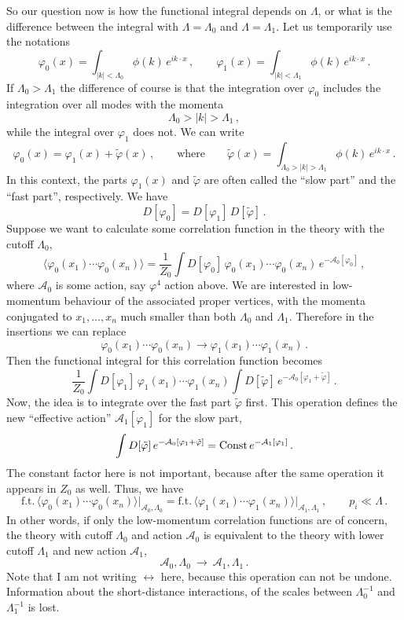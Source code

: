 So our question now is how the functional integral depends on $\Lambda$, or what
is the difference between the integral with $\Lambda=\Lambda_0$ and
$\Lambda=\Lambda_1$. Let us temporarily use the notations
\[
\varphi_0(x)=\int_{|k|<\Lambda_0}\phi(k)\,e^{ik\cdot x}\,,\qquad
\varphi_1(x)=\int_{|k|<\Lambda_1}\phi(k)\,e^{ik\cdot x}\,.
\]
If $\Lambda_0>\Lambda_1$ the difference of course is that the integration over
$\varphi_0$ includes the integration over all modes with the momenta
\[
\Lambda_0>|k|>\Lambda_1\,,
\]
while the integral over $\varphi_1$ does not. We can write
\[
\varphi_0(x)=\varphi_1(x)+\tilde\varphi(x)\,,\qquad\text{where}\qquad
\tilde\varphi(x)=\int_{\Lambda_0>|k|>\Lambda_1}\phi(k)\,e^{ik\cdot x}\,.
\]
In this context, the parts $\varphi_1(x)$ and $\tilde\varphi$ are often called
the ``slow part'' and the ``fast part'', respectively. We have
\[
D[\varphi_0]=D[\varphi_1]\,D[\tilde\varphi]\,.
\]
Suppose we want to calculate some correlation function in the theory with the
cutoff $\Lambda_0$,
\[
\bigl\langle\varphi_0(x_1)\cdots\varphi_0(x_n)\bigr\rangle=\frac1{Z_0}\int D[\varphi_0]\,\varphi_0(x_1)\cdots\varphi_0(x_n)\,e^{-\mathcal A_0[\varphi_0]}\,,
\]
where $\mathcal A_0$ is some action, say $\varphi^4$ action above. We are
interested in low-momentum behaviour of the associated proper vertices, with the
momenta conjugated to $x_1,\dots,x_n$ much smaller than both $\Lambda_0$ and
$\Lambda_1$. Therefore in the insertions we can replace
\[
\varphi_0(x_1)\cdots\varphi_0(x_n)\to\varphi_1(x_1)\cdots\varphi_1(x_n)\,.
\]
Then the functional integral for this correlation function becomes
\[
\frac1{Z_0}\int D[\varphi_1]\,\varphi_1(x_1)\cdots\varphi_1(x_n)\int D[\tilde\varphi]\,e^{-\mathcal A_0[\varphi_1+\tilde\varphi]}\,.
\]
Now, the idea is to integrate over the fast part $\tilde\varphi$ first. This
operation defines the new ``effective action'' $\mathcal A_1[\varphi_1]$ for the
slow part,
\[
\int D[\tilde\varphi]\,e^{-\mathcal A_0[\varphi_1+\tilde\varphi]}=\text{Const}\,e^{-\mathcal A_1[\varphi_1]}\,.
\]
The constant factor here is not important, because after the same operation it
appears in $Z_0$ as well. Thus, we have
\[
\text{f.t.}\,\bigl\langle\varphi_0(x_1)\cdots\varphi_0(x_n)\bigr\rangle\Big|_{\mathcal A_0,\Lambda_0}
=\text{f.t.}\,\bigl\langle\varphi_1(x_1)\cdots\varphi_1(x_n)\bigr\rangle\Big|_{\mathcal A_1,\Lambda_1}\,,\qquad p_i\ll\Lambda\,.
\]
In other words, if only the low-momentum correlation functions are of concern,
the theory with cutoff $\Lambda_0$ and action $\mathcal A_0$ is equivalent to the
theory with lower cutoff $\Lambda_1$ and new action $\mathcal A_1$,
\[
\mathcal A_0,\Lambda_0\ \to\ \mathcal A_1,\Lambda_1\,.
\]
Note that I am not writing $\leftrightarrow$ here, because this operation can not
be undone. Information about the short-distance interactions, of the scales
between $\Lambda_0^{-1}$ and $\Lambda_1^{-1}$ is lost.

